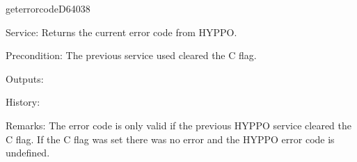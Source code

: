 \begin{hyppotrap}{geterrorcode}{D640}{38}
\item [Service:]
  Returns the current error code from HYPPO.
\item [Precondition:]
  The previous service used cleared the C flag.
\item [Outputs:]
\item [History:]
\item [Remarks:]
  The error code is only valid if the previous HYPPO service cleared the C flag.
  If the C flag was set there was no error and the HYPPO error code is
  undefined.


\end{hyppotrap}
